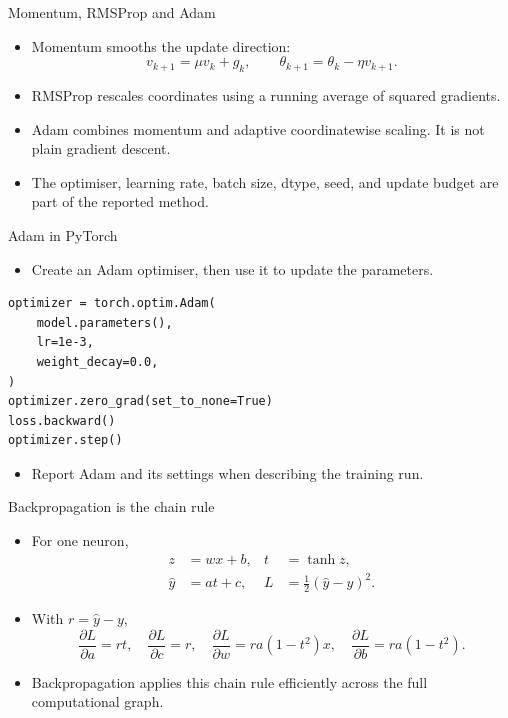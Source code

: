 \documentclass[aspectratio=43,11pt]{beamer}
\newcommand{\slideid}{L2}
\newenvironment{slideitems}{\small\begin{itemize}\setlength\itemsep{0.45em}}{\end{itemize}}
\begin{document}
\renewcommand{\slideid}{L2-S55}
\begin{frame}[t]{Momentum, RMSProp and Adam}
\begin{slideitems}
\item Momentum smooths the update direction:
\[
v_{k+1}=\mu v_k+g_k,
\qquad \theta_{k+1}=\theta_k-\eta v_{k+1}.
\]
\item RMSProp rescales coordinates using a running average of squared gradients.
\item Adam combines momentum and adaptive coordinatewise scaling. It is not plain gradient descent.
\item The optimiser, learning rate, batch size, dtype, seed, and update budget are part of the reported method.
\end{slideitems}
\end{frame}

\renewcommand{\slideid}{L2-S56}
\begin{frame}[fragile,t]{Adam in PyTorch}
\begin{slideitems}
\item Create an Adam optimiser, then use it to update the parameters.
\end{slideitems}
\begin{lstlisting}
optimizer = torch.optim.Adam(
    model.parameters(),
    lr=1e-3,
    weight_decay=0.0,
)
optimizer.zero_grad(set_to_none=True)
loss.backward()
optimizer.step()
\end{lstlisting}
\begin{slideitems}
\item Report Adam and its settings when describing the training run.
\end{slideitems}
\end{frame}

\renewcommand{\slideid}{L2-S57}
\begin{frame}[t]{Backpropagation is the chain rule}
\begin{slideitems}
\item For one neuron,
\[
\begin{aligned}
z&=wx+b, & t&=\tanh z,\\
\widehat y&=at+c, & L&=\frac12(\widehat y-y)^2.
\end{aligned}
\]
\item With $r=\widehat y-y$,
\[
\frac{\partial L}{\partial a}=rt,
\quad
\frac{\partial L}{\partial c}=r,
\quad
\frac{\partial L}{\partial w}=ra(1-t^2)x,
\quad
\frac{\partial L}{\partial b}=ra(1-t^2).
\]
\item Backpropagation applies this chain rule efficiently across the full computational graph.
\end{slideitems}
\end{frame}
\end{document}
